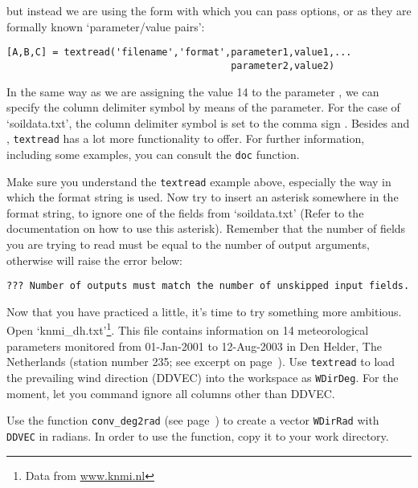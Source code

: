 but instead we are using the form with which you can pass options, or as they are formally known `parameter/value pairs':
\begin{lstlisting}[numbers=none]
[A,B,C] = textread('filename','format',parameter1,value1,...
                                       parameter2,value2)
\end{lstlisting}
In the same way as we are assigning the value 14 to the parameter {\tt {}}, we can specify the column delimiter symbol by means of the {\tt {}} parameter. For the case of `soildata.txt', the column delimiter symbol is set to the comma sign {\tt \squote{,}}. Besides {\tt {}} and {\tt {}}, {\tt textread} has a lot more functionality to offer. For further information, including some examples, you can consult the {\tt doc} function. 
\begin{action}
Make sure you understand the {\tt textread} example above, especially the way in which the format string is used. Now try to insert an asterisk somewhere in the format string, to ignore one of the fields from `soildata.txt' (Refer to the documentation on how to use this asterisk). Remember that the number of fields you are trying to read must be equal to the number of output arguments, otherwise \MATLAB{} will raise the error below:
\end{action}
\begin{lstlisting}[numbers=none]
??? Number of outputs must match the number of unskipped input fields.
\end{lstlisting}
\begin{action}
Now that you have practiced a little, it's time to try something more ambitious. Open `knmi\_dh.txt'\footnote{Data from \url{www.knmi.nl}}. This file contains information on 14 meteorological parameters monitored from 01-Jan-2001 to 12-Aug-2003 in Den Helder, The Netherlands (station number 235; see excerpt on page~\pageref{list:knmi_dh}). Use {\tt textread} to load the prevailing wind direction (DDVEC) into the \MATLAB{} workspace as {\tt WDirDeg}. For the moment, let you command ignore all columns other than DDVEC.
\end{action}
\begin{action}
Use the function {\tt conv\_deg2rad} (see page~\pageref{lab:conv_deg2rad}) to create a vector {\tt WDirRad} with {\tt DDVEC} in radians. In order to use the function, copy it to your work directory.
\end{action}
